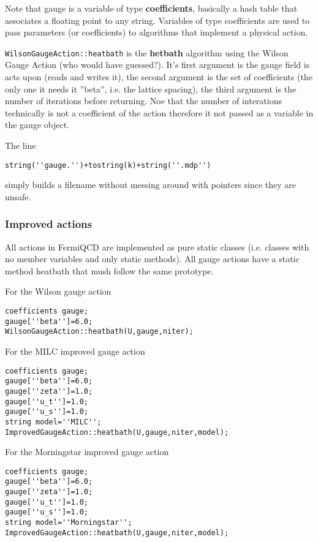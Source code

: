 Note that gauge is a variable of type {\bf coefficients}, basically a hash
table that associates a floating point to any string. Variables of type
coefficients are used to pass parameters (or coefficients) to algorithms
that implement a physical action.

{\tt WilsonGaugeAction::heatbath} is the {\bf hetbath} algorithm using the
Wilson Gauge Action (who would have guessed?). It's first argument is the
gauge field is acts upon (reads and writes it), the second argument is the
set of coefficients (the only one it needs it ''beta'', i.e. the lattice
spacing), the third argument is the number of iterations before returning.
Noe that the number of interations technically is not a coefficient of the
action therefore it not passed as a variable in the gauge object.

The line
\begin{verbatim}
string(''gauge.'')+tostring(k)+string(''.mdp'')
\end{verbatim}

simply builds a filename without messing around with pointers since they are
unsafe.

\subsubsection{Improved actions}

All actions in FermiQCD are implemented as pure static classes (i.e. classes
with no member variables and only static methods). All gauge actions have a
static method heatbath that mush follow the same prototype.

For the Wilson gauge action
\begin{verbatim}
coefficients gauge;
gauge[''beta'']=6.0;    
WilsonGaugeAction::heatbath(U,gauge,niter);
\end{verbatim}

For the MILC improved gauge action
\begin{verbatim}
coefficients gauge;
gauge[''beta'']=6.0;    
gauge[''zeta'']=1.0;    
gauge[''u_t'']=1.0;    
gauge[''u_s'']=1.0;    
string model=''MILC'';
ImprovedGaugeAction::heatbath(U,gauge,niter,model);
\end{verbatim}

For the Morningstar improved gauge action
\begin{verbatim}
coefficients gauge;
gauge[''beta'']=6.0;    
gauge[''zeta'']=1.0;    
gauge[''u_t'']=1.0;    
gauge[''u_s'']=1.0;    
string model=''Morningstar'';
ImprovedGaugeAction::heatbath(U,gauge,niter,model);
\end{verbatim}

